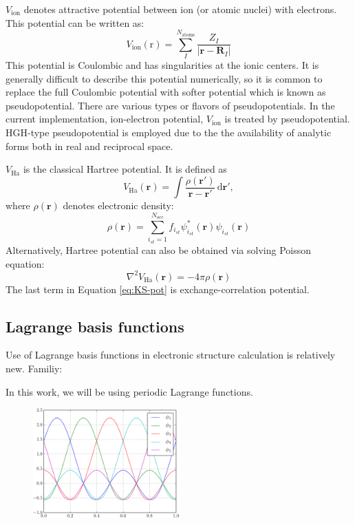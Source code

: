 $V_{\mathrm{ion}}$ denotes attractive potential between ion (or atomic nuclei)
with electrons. This potential can be written as:
\begin{equation}
V_{\mathrm{ion}}(\mathrm{r}) =
\sum_{I}^{N_{\mathrm{atoms}}}
\frac{Z_{I}}{ \left| \mathbf{r} - \mathbf{R}_{I} \right| }
\end{equation}
This potential is Coulombic and has singularities
at the ionic centers. It is generally difficult to describe this potential
numerically, so it is common to replace the full Coulombic potential
with softer potential which is known as pseudopotential.
There are various types or flavors of pseudopotentials.
In the current implementation, ion-electron potential, $V_{\mathrm{ion}}$
is treated by pseudopotential. HGH-type pseudopotential is employed due to the
the availability of analytic forms both in real and reciprocal space.

$V_{\mathrm{Ha}}$ is the classical Hartree potential. It is defined as
\begin{equation}
V_{\mathrm{Ha}}(\mathbf{r}) = \int
\frac{\rho(\mathbf{r}')}
{\mathbf{r} - \mathbf{r}'}\,\mathrm{d}\mathbf{r}',
\end{equation}
where $\rho(\mathbf{r})$ denotes electronic density:
\begin{equation}
\rho(\mathbf{r}) = \sum_{i_{st}=1}^{N_{\mathrm{occ}}}
f_{i_{st}}
\psi^{*}_{i_{st}}(\mathbf{r}) \psi_{i_{st}}(\mathbf{r})
\end{equation}
Alternatively, Hartree potential can also be obtained via solving Poisson equation:
\begin{equation}
\nabla^{2} V_{\mathrm{Ha}}(\mathbf{r}) = -4\pi \rho(\mathbf{r})
\end{equation}
The last term in Equation \eqref{eq:KS-pot} is exchange-correlation potential.

\subsection{Lagrange basis functions}

Use of Lagrange basis functions in electronic structure calculation is relatively new.
Familiy:

In this work, we will be using periodic Lagrange functions.

\begin{figure}
\includegraphics[width=0.5\textwidth]{images/plot_LF_p_N_5.pdf}
\end{figure}

